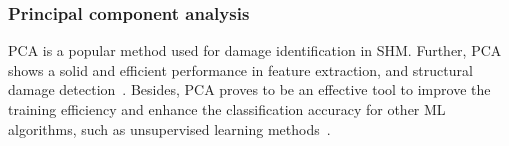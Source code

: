 \subsubsection{Principal component analysis}
PCA is a popular method used for damage identification in SHM.
Further, PCA shows a solid and efficient performance in feature extraction, and structural damage detection~\cite{liu2014research, wang2014principal, nguyen2010fault}. 
Besides, PCA proves to be an effective tool to improve the training efficiency and enhance the classification accuracy for other ML algorithms, such as unsupervised learning methods~\cite{liu2019rapid, datteo2017statistical, torres2014data}. 

